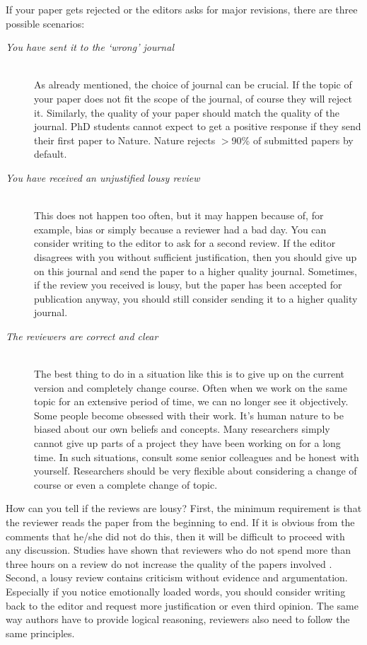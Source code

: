 \documentclass[graybox,envcountchap,sectrefs,UStrade]{svmono}
\begin{document}
If your paper gets rejected or the editors asks for major revisions, there are three possible scenarios:

\begin{description}
\item[\emph{You have sent it to the `wrong' journal}] \hfill \\
      As already mentioned, the choice of journal can be crucial. If the topic of your paper does not fit the scope of the journal, of course they will reject it. Similarly, the quality of your paper should match the quality of the journal. PhD students cannot expect to get a positive response if they send their first paper to Nature. Nature rejects $>$90\% of submitted papers by default. \medskip
\item[\emph{You have received an unjustified lousy review}] \hfill \\
      This does not happen too often, but it may happen because of, for example, bias or simply because a reviewer had a bad day. You can consider writing to the editor to ask for a second review. If the editor disagrees with you without sufficient justification, then you should give up on this journal and send the paper to a higher quality journal. Sometimes, if the review you received is lousy, but the paper has been accepted for publication anyway, you should still consider sending it to a higher quality journal. \medskip
\item[\emph{The reviewers are correct and clear}] \hfill \\
      The best thing to do in a situation like this is to give up on the current version and completely change course. Often when we work on the same topic for an extensive period of time, we can no longer see it objectively. Some people become obsessed with their work. It's human nature to be biased about our own beliefs and concepts. Many researchers simply cannot give up parts of a project they have been working on for a long time. In such situations, consult some senior colleagues and be honest with yourself. Researchers should be very flexible about considering a change of course or even a complete change of topic.
\end{description}

How can you tell if the reviews are lousy? First, the minimum requirement is that the reviewer reads the paper from the beginning to end. If it is obvious from the comments that he/she did not do this, then it will be difficult to proceed with any discussion. Studies have shown that reviewers who do not spend more than three hours on a review do not increase the quality of the papers involved \citep{Evans1993JGIM}. Second, a lousy review contains criticism without evidence and argumentation. Especially if you notice emotionally loaded words, you should consider writing back to the editor and request more justification or even third opinion. The same way authors have to provide logical reasoning, reviewers also need to follow the same principles.\par
\end{document}
